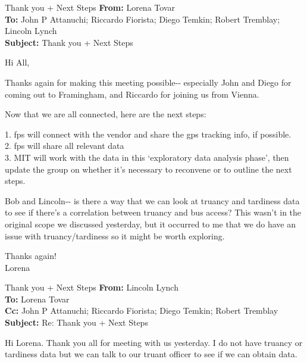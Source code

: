 {
\small
\begin{emailbox}{Thank you + Next Steps}
    \textbf{From:} Lorena Tovar \\
    \textbf{To:} John P Attanuchi; Riccardo Fiorista; Diego Temkin; Robert Tremblay; Lincoln Lynch  \\
    \textbf{Subject:} Thank you + Next Steps

    \vspace{1em}
    Hi All, \vspace{1em}

    Thanks again for making this meeting possible-\/- especially John and Diego for coming out to Framingham, and Riccardo for joining us from Vienna. \vspace{1em}
    
    Now that we are all connected, here are the next steps: \vspace{1em}
    
    1. \acrshort{fps} will connect with the vendor and share the \acrshort{gps} tracking info, if possible. \\
    2. \acrshort{fps} will share all relevant data \\
    3. MIT will work with the data in this `exploratory data analysis phase', then update the group on whether it's necessary to reconvene or to outline the next steps. \vspace{1em}
    
    Bob and Lincoln-\/- is there a way that we can look at truancy and tardiness data to see if there's a correlation between truancy and bus access? This wasn't in the original scope we discussed yesterday, but it occurred to me that we do have an issue with truancy/tardiness so it might be worth exploring. \vspace{1em}
    
    Thanks again! \\
    Lorena
\end{emailbox}

\begin{emailbox}{Thank you + Next Steps}
    \textbf{From:} Lincoln Lynch \\
    \textbf{To:} Lorena Tovar \\
    \textbf{Cc:} John P Attanuchi; Riccardo Fiorista; Diego Temkin; Robert Tremblay \\
    \textbf{Subject:} Re: Thank you + Next Steps

    \vspace{1em}
    Hi Lorena. Thank you all for meeting with us yesterday. I do not have truancy or tardiness data but we can talk to our truant officer to see if we can obtain data. \vspace{1em}


\end{emailbox}}
